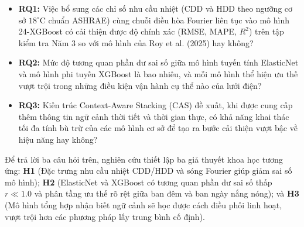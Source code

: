 \begin{itemize}
    \item \textbf{RQ1:} Việc bổ sung các chỉ số nhu cầu nhiệt (CDD và HDD theo ngưỡng cơ sở $18^\circ\text{C}$ chuẩn ASHRAE) cùng chuỗi điều hòa Fourier liên tục vào mô hình 24-XGBoost có cải thiện được độ chính xác (RMSE, MAPE, $R^2$) trên tập kiểm tra Năm 3 so với mô hình của Roy et al. (2025) hay không?
    \item \textbf{RQ2:} Mức độ tương quan phần dư sai số giữa mô hình tuyến tính ElasticNet và mô hình phi tuyến XGBoost là bao nhiêu, và mỗi mô hình thể hiện ưu thế vượt trội trong những điều kiện vận hành cụ thể nào của lưới điện?
    \item \textbf{RQ3:} Kiến trúc Context-Aware Stacking (CAS) đề xuất, khi được cung cấp thêm thông tin ngữ cảnh thời tiết và thời gian thực, có khả năng khai thác tối đa tính bù trừ của các mô hình cơ sở để tạo ra bước cải thiện vượt bậc về hiệu năng hay không?
\end{itemize}

Để trả lời ba câu hỏi trên, nghiên cứu thiết lập ba giả thuyết khoa học tương ứng: \textbf{H1} (Đặc trưng nhu cầu nhiệt CDD/HDD và sóng Fourier giúp giảm sai số mô hình); \textbf{H2} (ElasticNet và XGBoost có tương quan phần dư sai số thấp $r \ll 1.0$ và phân tầng ưu thế rõ rệt giữa ban đêm và ban ngày nắng nóng); và \textbf{H3} (Mô hình tổng hợp nhận biết ngữ cảnh sẽ học được cách điều phối linh hoạt, vượt trội hơn các phương pháp lấy trung bình cố định).

